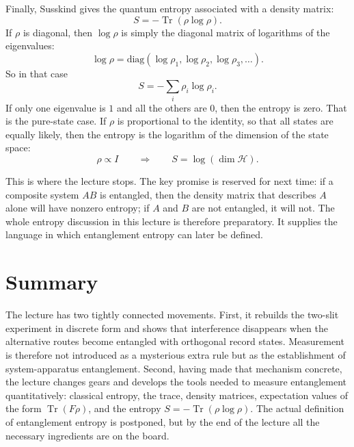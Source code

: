 Finally, Susskind gives the quantum entropy associated with a density matrix:
\begin{equation}
S=-\operatorname{Tr}(\rho\log\rho) .
\end{equation}
If \(\rho\) is diagonal, then \(\log\rho\) is simply the diagonal matrix of logarithms of the eigenvalues:
\begin{equation}
\log\rho
=
\mathrm{diag}(\log\rho_1,\log\rho_2,\log\rho_3,\ldots) .
\end{equation}
So in that case
\begin{equation}
S=-\sum_i \rho_i \log\rho_i .
\end{equation}
If only one eigenvalue is \(1\) and all the others are \(0\), then the entropy is zero. That is the pure-state case. If \(\rho\) is proportional to the identity, so that all states are equally likely, then the entropy is the logarithm of the dimension of the state space:
\begin{equation}
\rho \propto I
\qquad \Longrightarrow \qquad
S=\log(\dim \mathcal H) .
\end{equation}

This is where the lecture stops. The key promise is reserved for next time: if a composite system \(AB\) is entangled, then the density matrix that describes \(A\) alone will have nonzero entropy; if \(A\) and \(B\) are not entangled, it will not. The whole entropy discussion in this lecture is therefore preparatory. It supplies the language in which entanglement entropy can later be defined.

\section{Summary}

The lecture has two tightly connected movements. First, it rebuilds the two-slit experiment in discrete form and shows that interference disappears when the alternative routes become entangled with orthogonal record states. Measurement is therefore not introduced as a mysterious extra rule but as the establishment of system-apparatus entanglement. Second, having made that mechanism concrete, the lecture changes gears and develops the tools needed to measure entanglement quantitatively: classical entropy, the trace, density matrices, expectation values of the form \(\operatorname{Tr}(F\rho)\), and the entropy \(S=-\operatorname{Tr}(\rho\log\rho)\). The actual definition of entanglement entropy is postponed, but by the end of the lecture all the necessary ingredients are on the board.
